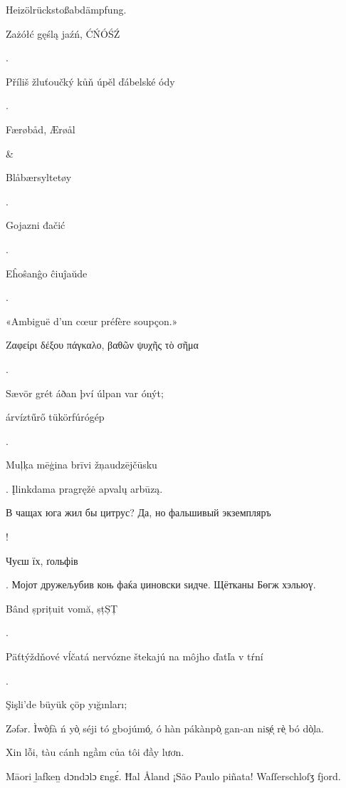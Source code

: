 \documentclass[a4paper,14pt]{memoir}
\begin{document}
{Heizölrückstoßabdämpfung. \begin{polish}{Zażółć gęślą jaźń, ĆŃÓŚŹ}\end{polish}. %
\begin{czech}Příliš žluťoučký kůň úpěl ďábelské ódy\end{czech}.
\begin{danish}Færøbåd, Ærøål\end{danish} \& \begin{norsk}Blåbærsyltetøy\end{norsk}.
\begin{croatian}Gojazni đačić\end{croatian}. \begin{esperanto}Eĥoŝanĝo ĉiuĵaŭde\end{esperanto}.
\begin{french}«Ambiguë d'un cœur préfère soupçon.»\end{french} \begin{greek}Ζαφείρι δέξου πάγκαλο, βαθῶν ψυχῆς τὸ σῆμα\end{greek}.
\begin{icelandic}Sævör grét áðan því úlpan var ónýt;\end{icelandic} \begin{magyar}árvíztűrő tükörfúrógép\end{magyar}.
\begin{latvian}Muļķa mēģina brīvi žņaudzējčūsku\end{latvian}.
Įlinkdama pragręžė apvalų arbūzą. %
\begin{russian}В чащах юга жил бы цитрус? Да, но фальшивый экземпляръ\end{russian}!
\begin{ukrainian}Чуєш їх, ґольфів\end{ukrainian}. Мојот дружељубив коњ фаќа џиновски ѕидче. Щётканы Бөгж хэльюү. %
\begin{romanian}{Bând șprițuit vomă, şţŞŢ}\end{romanian}.
\begin{slovak}Päťtýždňové vĺčatá nervózne štekajú na môjho ďatľa v tŕní\end{slovak}.
\begin{turkish}{Şişli'de büyük çöp yığınları;}\end{turkish} Zəfər. %
Ìwò̩fà ń yò̩ séji tó gbojúmó̩, ó hàn pákànpò̩ gan-an nis̩é̩ rè̩ bó dò̩la. %
\begin{vietnamese}Xin lỗi, tàu cánh ngầm của tôi đầy lươn.\end{vietnamese}
Māori ḻafkeṉ dɔndɔlɔ ɛngɛ́. Ħal Åland ¡São Paulo piñata! Waſſerschloſʒ fjord. %

}
\end{document}
